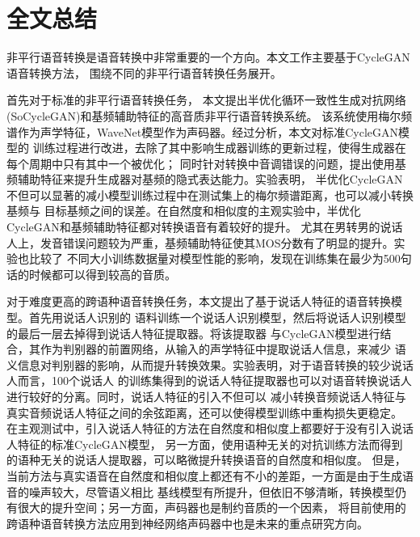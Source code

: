\chapter{全文总结}
非平行语音转换是语音转换中非常重要的一个方向。本文工作主要基于CycleGAN语音转换方法，
围绕不同的非平行语音转换任务展开。

首先对于标准的非平行语音转换任务，
本文提出半优化循环一致性生成对抗网络(SoCycleGAN)和基频辅助特征的高音质非平行语音转换系统。
该系统使用梅尔频谱作为声学特征，WaveNet模型作为声码器。经过分析，本文对标准CycleGAN模型的
训练过程进行改进，去除了其中影响生成器训练的更新过程，使得生成器在每个周期中只有其中一个被优化；
同时针对转换中音调错误的问题，提出使用基频辅助特征来提升生成器对基频的隐式表达能力。实验表明，
半优化CycleGAN不但可以显著的减小模型训练过程中在测试集上的梅尔频谱距离，也可以减小转换基频与
目标基频之间的误差。在自然度和相似度的主观实验中，半优化CycleGAN和基频辅助特征都对转换语音有着较好的提升。
尤其在男转男的说话人上，发音错误问题较为严重，基频辅助特征使其MOS分数有了明显的提升。实验也比较了
不同大小训练数据量对模型性能的影响，发现在训练集在最少为500句话的时候都可以得到较高的音质。

对于难度更高的跨语种语音转换任务，本文提出了基于说话人特征的语音转换模型。首先用说话人识别的
语料训练一个说话人识别模型，然后将说话人识别模型的最后一层去掉得到说话人特征提取器。将该提取器
与CycleGAN模型进行结合，其作为判别器的前置网络，从输入的声学特征中提取说话人信息，来减少
语义信息对判别器的影响，从而提升转换效果。实验表明，对于语音转换的较少说话人而言，100个说话人
的训练集得到的说话人特征提取器也可以对语音转换说话人进行较好的分离。同时，说话人特征的引入不但可以
减小转换音频说话人特征与真实音频说话人特征之间的余弦距离，还可以使得模型训练中重构损失更稳定。
在主观测试中，引入说话人特征的方法在自然度和相似度上都要好于没有引入说话人特征的标准CycleGAN模型，
另一方面，使用语种无关的对抗训练方法而得到的语种无关的说话人提取器，可以略微提升转换语音的自然度和相似度。
但是，当前方法与真实语音在自然度和相似度上都还有不小的差距，一方面是由于生成语音的噪声较大，尽管语义相比
基线模型有所提升，但依旧不够清晰，转换模型仍有很大的提升空间；另一方面，声码器也是制约音质的一个因素，
将目前使用的跨语种语音转换方法应用到神经网络声码器中也是未来的重点研究方向。
